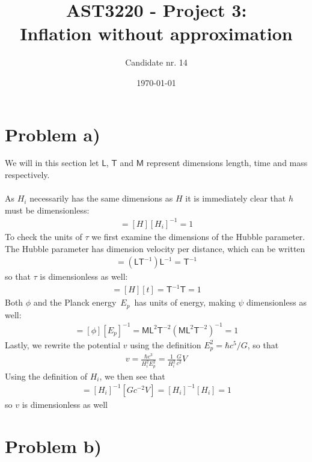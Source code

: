 \documentclass[reprint,english,notitlepage]{revtex4-1}  %
\numberwithin{equation}{section}
\newcommand{\TT}{\textsf{T}}
\newcommand{\LL}{\textsf{L}}
\newcommand{\MM}{\textsf{M}}
\begin{document}
\title{AST3220 - Project 3: \\ Inflation without approximation}   %
\author{Candidate nr. 14}
\date{\today}                             %
\noaffiliation                            %
\maketitle                                %

\section{Problem a)}
We will in this section let $\LL$, $\TT$ and $\MM$ represent dimensions length, time
and mass respectively.
\\
\\
As $H_i$ necessarily has the same dimensions as $H$ it is immediately
clear that $h$ must be dimensionless:
\begin{align}
	[h] = [H] [H_i]^{-1} = 1
\end{align}
To check the units of $\tau$ we first examine the dimensions of the Hubble
parameter. The Hubble parameter has dimension velocity per distance, which can
be written
\begin{align}
	[H] = (\LL \TT^{-1}) \LL^{-1} = \TT^{-1}
\end{align}
so that $\tau$ is dimensionless as well:
\begin{align}
  [\tau] = [H] [t] = \TT^{-1} \TT = 1
\end{align}
Both $\phi$ and the Planck energy $E_p$ has units of energy, making $\psi$ dimensionless
as well:
\begin{align}
	[\psi] = [\phi] [E_p]^{-1} = \MM \LL^2 \TT^{-2} (\MM \LL^2 \TT^{-2})^{-1} = 1
\end{align}
Lastly, we rewrite the potential $v$ using the definition $E_p^2 = \hbar c^5/G$,
so that
\begin{align}
	v = \frac{\hbar c^3}{H_i^2 E_p^2} = \frac{1}{H_i^2} \frac{G}{c^2}V
\end{align}
Using the definition of $H_i$, we then see that
\begin{align}
	[v] = [H_i]^{-1} [G c^{-2} V] = [H_i]^{-1}[H_i] = 1
\end{align}
so $v$ is dimensionless as well

\section{Problem b)}
\end{document}
